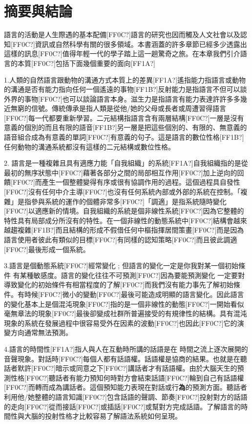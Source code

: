 \section{摘要與結論} %

語言的活動是人生際遇的基本配備[FF0C?]語言的研究也因而觸及人文社會以及認知[FF0C?]資訊或自然科學有關的很多領域。本書涵蓋的許多章節已經多少透露出這樣的訊息[FF0C?]值得年輕一代的學子踏上這一趟驚奇之旅。在本章我們引介語言的本質[FF0C?]包括下面幾個重要的面向[FF1A?]

1.人類的自然語言跟動物的溝通方式本質上的差異[FF1A?]遙指能力指語言或動物的溝通是否有能力指向任何一個遙遠的事物[FF1B?]反射能力是指語言不但可以談外界的事物[FF0C?]也可以談論語言本身。滋生力是指語言有能力表達許許多多幾近無窮的信號。傳統傳承是指人類是從他/她的父母或長者或周遭習得語言[FF0C?]每一代都要重新學習。二元結構指語言含有兩層結構[FF0C?]一層是沒有意義的個別的而且有限的語音[FF1B?]另一層是把這些個別的、有限的、無意義的語音組合成為有意義的單詞[FF0C?]有意義的句子。這是語言的數位性格[FF1B?]任何動物的溝通系統都沒有這樣的二元結構或數位性格。

2. 語言是一種複雜且具有適應力能「自我組織」的系統[FF1A?]自我組織指的是從最初的無序狀態中[FF0C?]藉著各部分之間的局部相互作用[FF0C?]加上逆向的回饋[FF0C?]而產生一個整體變得有序或很有協調作用的過程。這個過程具自發性[FF0C?]沒有任何中介主導[FF0C?]也沒有任何系統內部或外部的系統在控制。「複雜」是指參與系統的運作的個體非常多[FF0C?]「調適」是指系統隨時變化[FF0C?]以適應新的情境。自我組織的系統是個非線性系統[FF0C?]因為它整體的特性具有局部成分所沒有的特性。在一個非線性的動態系統中[FF0C?]結構會越來越趨複雜[FF1B?]而且結構的形成不假借任何中樞指揮居間策畫[FF0C?]而是因為語言使用者彼此有類似的目標[FF0C?]有同樣的認知策略[FF0C?]而且彼此調適[FF0C?]最後形成一個系統。

3.語言是個動態系統[FF0C?]經常變化 ; 但語言的變化一定是你我對某一個初始條件 有某種敏感度。語言的變化往往不可預測[FF0C?]因為要能預測變化 一定要對導致變化的初始條件有相當程度的了解[FF0C?]而我們沒有能力事先了解初始條件。有時候[FF0C?]微小的變動[FF0C?]最後可能造成明顯的語言變化。因此語言的變化基本上是個混沌現象[FF0C?]指的是一個非線性的動態[FF0C?]一開始看似毫無章法的現象[FF0C?]最後卻變成社群所普遍接受的有規律性的結構。具有混沌現象的系統在發展過程中很容易受外在因素的波動[FF0C?]也因此[FF0C?]它的演變方向通常無法預測。

4.語言的時間性[FF1A?]指人與人在互動時所講的話語是在 時間之流上逐次展開的音聲現象。對話時[FF0C?]每個人都有話語權。話語權是協商的結果。也就是在聽話者默許[FF0C?]暗示或同意之下[FF0C?]講話者才有話語權。由於大腦天生的預測性格[FF0C?]聽話者有能力預知何時對方會結束話語[FF0C?]輪到自己有話語權[FF0C?]而轉而成為講話者。這個預知能力表現在對話或行\textbf{為}的預測方面。聽話者利用他/她整體的語言知識[FF0C?]包含話語的聲調、節奏[FF0C?]投射對方的話語的走向[FF0C?]從而接話[FF0C?]或插話[FF0C?]或幫對方完成話語。了解語言的時間性與大腦的投射性格才比較容易了解語法系統如何呈現。

